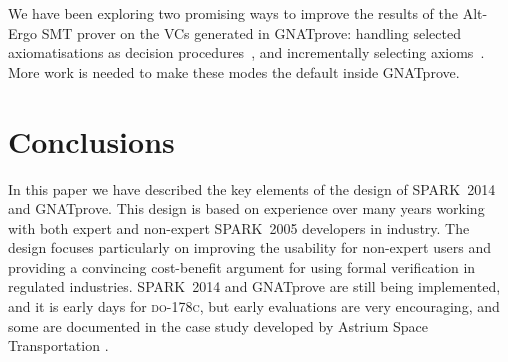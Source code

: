 \documentclass[sttt,final]{svjour}
\newcommand{\DOC}{\textsc{do-178c}}
\newcommand{\gnatprove}{GNATprove\xspace}
\newcommand{\oldspark}{SPARK~2005\xspace}
\newcommand{\newspark}{SPARK~2014\xspace}
\begin{document}
We have been exploring two promising ways to improve the results of the
Alt-Ergo SMT prover on the VCs generated in \gnatprove: handling selected
axiomatisations as decision procedures~\cite{dross:2012:smt}, and incrementally
selecting axioms~\cite{cgs09:ipo,kuhlwein:2012:ijcar}. More work is needed to
make these modes the default inside \gnatprove.

\section{Conclusions}
\label{conclusions}
In this paper we have described the key elements of the design of
\newspark and \gnatprove. This design is based on experience over many
years working with both expert and non-expert \oldspark developers in
industry. The design focuses particularly on improving the usability for
non-expert users and providing a convincing cost-benefit argument for
using formal verification in regulated industries. \newspark and
\gnatprove are still being implemented, and it is early days for
\DOC, but early evaluations are very encouraging, and some are
documented in the case study developed by Astrium Space Transportation
\cite{dasia2013}.
%


\end{document}

